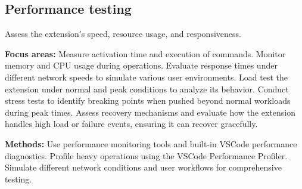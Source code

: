 \subsection{Performance testing} Assess the extension’s speed, resource usage, and responsiveness.

\textbf{Focus areas:} Measure activation time and execution of commands. Monitor memory and CPU usage during operations. Evaluate response times under different network speeds to simulate various user environments. Load test the extension under normal and peak conditions to analyze its behavior. Conduct stress tests to identify breaking points when pushed beyond normal workloads during peak times. Assess recovery mechanisms and evaluate how the extension handles high load or failure events, ensuring it can recover gracefully.

\textbf{Methods:} Use performance monitoring tools and built-in VSCode performance diagnostics. Profile heavy operations using the VSCode Performance Profiler. Simulate different network conditions and user workflows for comprehensive testing.